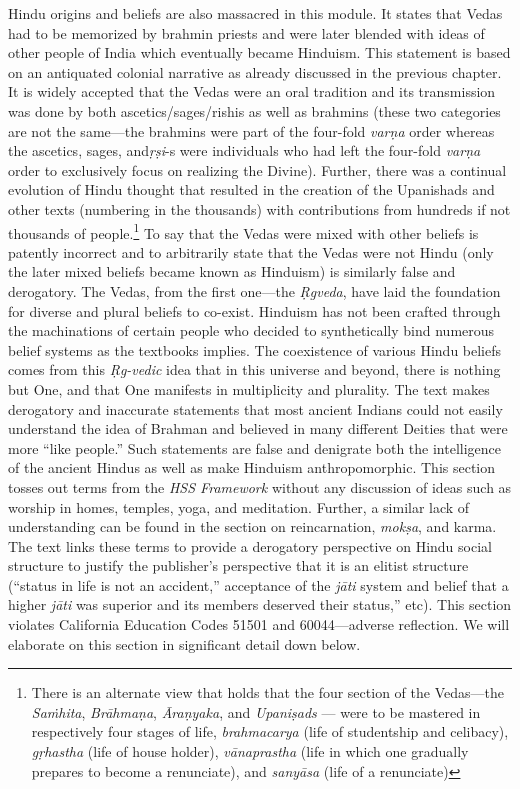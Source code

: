 Hindu origins and beliefs are also massacred in this module. It states that Vedas had to be memorized by brahmin priests and were later blended with ideas of other people of India which eventually became Hinduism. This statement is based on an antiquated colonial narrative as already discussed in the previous chapter. It is widely accepted that the Vedas were an oral tradition and its transmission was done by both ascetics/sages/rishis as well as brahmins (these two categories are not the same—the brahmins were part of the four-fold \textit{varṇa}  order whereas the ascetics, sages, and\break \textit{ṛṣi}-s were individuals who had left the four-fold \textit{varṇa}  order to exclusively focus on realizing the Divine). Further, there was a continual evolution of Hindu thought that resulted in the creation of the Upanishads and other texts (numbering in the thousands) with contributions from hundreds if not thousands of people.\footnote{There is an alternate view that holds that the four section of the Vedas—the \textit{Saṁhita}, \textit{Brāhmaṇa}, \textit{Āraṇyaka}, and \textit{Upaniṣads} — were to be mastered in respectively four stages of life, \textit{brahmacarya} (life of studentship and celibacy), \textit{gṛhastha} (life of house holder), \textit{vānaprastha} (life in which one gradually prepares to become a renunciate), and \textit{sanyāsa} (life of a renunciate)} To say that the Vedas were mixed with other beliefs is patently incorrect and to arbitrarily state that the Vedas were not Hindu (only the later mixed beliefs became known as Hinduism) is similarly false and derogatory. The Vedas, from the first one—the \textit{Ṛgveda}, have laid the foundation for diverse and plural beliefs to co-exist. Hinduism has not been crafted through the machinations of certain people who decided to synthetically bind numerous belief systems as the textbooks implies. The coexistence of various Hindu beliefs comes from this \textit{Ṛg-vedic} idea that in this universe and beyond, there is nothing but One, and that One manifests in multiplicity and plurality. The text makes derogatory and inaccurate statements that most ancient Indians could not easily understand the idea of Brahman and believed in many different Deities that were more “like people.” Such statements are false and denigrate both the intelligence of the ancient Hindus as well as make Hinduism anthropomorphic. This section tosses out terms from the \textit{HSS Framework} without any discussion of ideas such as worship in homes, temples, yoga, and meditation. Further, a similar lack of understanding can be found in the section on reincarnation, \textit{mokṣa}, and karma. The text links these terms to provide a derogatory perspective on Hindu social structure to justify the publisher’s perspective that it is an elitist structure (“status in life is not an accident,” acceptance of the \textit{jāti} system and belief that a higher \textit{jāti} was superior and its members deserved their status,” etc). This section violates California Education Codes 51501 and 60044—adverse reflection. We will elaborate on this section in significant detail down below.  

